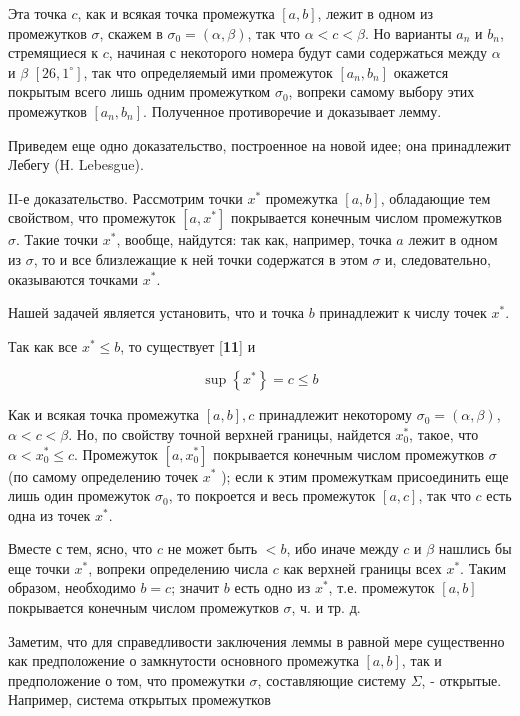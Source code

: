 \documentclass[10pt, twoside]{article}
\begin{document}
  Эта точка $c$, как и всякая точка промежутка $[a, b]$, лежит в одном из промежутков $\sigma$, скажем в $\sigma_{0}=(\alpha, \beta)$, так что $\alpha<c<\beta$. Но варианты $a_{n}$ и $b_{n}$, стремящиеся к $c$, начиная с некоторого номера будут сами содержаться между $\alpha$ и $\beta$ $[26,1^{\circ}]$, так что определяемый ими промежуток $\left[a_{n}, b_{n}\right]$ окажется покрытым всего лишь одним промежутком $\sigma_{0}$, вопреки самому выбору этих промежутков $\left[a_{n}, b_{n}\right]$. Полученное противоречие и доказывает лемму.

  Приведем еще одно доказательство, построенное на новой идее; она принадлежит Лебегу (H. Lebesgue).

  II-е доказательство. Рассмотрим точки $x^{*}$ промежутка $[a, b]$, обладающие тем свойством, что промежуток $\left[a, x^{*}\right]$ покрывается конечным числом промежутков $\sigma$. Такие точки $x^{*}$, вообще, найдутся: так как, например, точка $a$ лежит в одном из $\sigma$, то и все близлежащие к ней точки содержатся в этом $\sigma$ и, следовательно, оказываются точками $x^{*}$.

  Нашей задачей является установить, что и точка $b$ принадлежит к числу точек $x^{*}$.

  Так как все $x^{*} \leqslant b$, то существует [\textbf{11}] и

$$
  \sup \left\{x^{*}\right\}=c \leqslant b
$$

Как и всякая точка промежутка $[a, b], c$ принадлежит некоторому $\sigma_{0}=(\alpha, \beta)$, $\alpha<c<\beta$. Но, по свойству точной верхней границы, найдется $x_{0}^{*}$, такое, что $\alpha<x_{0}^{*} \leqslant c$. Промежуток $\left[a, x_{0}^{*}\right]$ покрывается конечным числом промежутков $\sigma$ (по самому определению точек $x^{*}$ ); если к этим промежуткам присоединить еще лишь один промежуток $\sigma_{0}$, то покроется и весь промежуток $[a, c]$, так что $c$ есть одна из точек $x^{*}$.

Вместе с тем, ясно, что $c$ не может быть $<b$, ибо иначе между $c$ и $\beta$ нашлись бы еще точки $x^{*}$, вопреки определению числа $c$ как верхней границы всех $x^{*}$. Таким образом, необходимо $b=c$; значит $b$ есть одно из $x^{*}$, т.е. промежуток $[a, b]$ покрывается конечным числом промежутков $\sigma$, ч. и тр. д.

Заметим, что для справедливости заключения леммы в равной мере существенно как предположение о замкнутости основного промежутка $[a, b]$, так и предположение о том, что промежутки $\sigma$, составляющие систему $\Sigma$, - открытые. Например, система открытых промежутков
\end{document}
